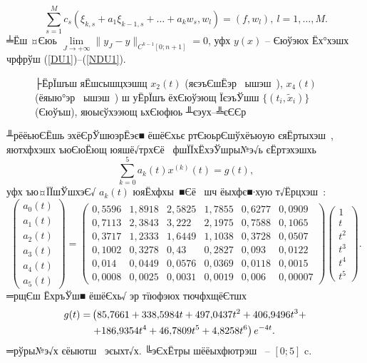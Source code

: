 \documentclass[12pt, a4paper, oneside]{article}
\begin{document}
\[
\sum\limits_{s=1}^M c_s ({\xi}_{k,s}+a_1 {\xi}_{k-1,s}+\dots +a_k w_s,w_l)=(f,w_l),~l=1,\dots,M.
\]
╧Ёш ¤Єюь $\lim\limits_{J\to +\infty} \|y_J-y\|_{C^{k-1}[0;n+1]}=0$, уфх $y(x)$ -- Єюўэюх Ёх°хэшх чрфрўш (\ref{DU1})--(\ref{NDU1}).
\begin{figure}[h]
\caption{├ЁрЇшъш яЁшсышцхэшщ $x_2(t)$ (яєэъЄшЁэр  ышэш ), $x_4(t)$ (ёяыю°эр  ышэш ) ш уЁрЇшъ ёхЄюўэющ ЇєэъЎшш $\{(t_i,\tilde{x}_i)\}$ (Єюўъш), яюыєўхээющ ьхЄюфюь ╨єэух--╩єЄЄр}
\label{LS5_J4_n1_T5}
\end{figure}
\begin{Ex} %
╨рёёьюЄЁшь эхёЄрЎшюэрЁэє■ ёшёЄхьє ртЄюьрЄшўхёъюую єяЁртыхэш , яютхфхэшх ъюЄюЁющ юяшё√трхЄё  фшЇЇхЁхэЎшры№э√ь єЁртэхэшхь
\[
\sum\limits_{k=0}^5 a_k(t)x^{(k)}(t)=g(t),
\]
уфх ъю¤ЇЇшЎшхэЄ√ $a_k(t)$ юяЁхфхы ■Єё  шч ёыхфє■∙хую т√Ёрцхэш :
\[
\begin{pmatrix}a_0(t)\\a_1(t)\\a_2(t)\\a_3(t)\\a_4(t)\\a_5(t)\end{pmatrix}=\begin{pmatrix}0{,}5596&1{,}8918&2{,}5825&1{,}7855&0{,}6277&0{,}0909\\
0{,}7113&2{,}3843&3{,}222&2{,}1975&0{,}7588&0{,}1065\\
0{,}3717&1{,}2333&1{,}6449&1{,}1038&0{,}3728&0{,}0507\\
0{,}1002&0{,}3278&0{,}43&0{,}2827&0{,}093&0{,}0122\\
0{,}014&0{,}0449&0{,}0576&0{,}0369&0{,}0118&0{,}0015\\
0{,}0008&0{,}0025&0{,}0031&0{,}0019&0{,}006&0{,}00007\end{pmatrix}
\begin{pmatrix}1\\t\\t^2\\t^3\\t^4\\t^5\end{pmatrix}.
\]
═рщЄш ЁхръЎш■ ёшёЄхь√ эр тїюфэюх тючфхщёЄтшх
\begin{align}
g(t)=&\left(85{,}7661+338{,}5984t+497{,}0437t^2+406{,}9496t^3+\right.\notag\\
&\left.+186{,}9354t^4+46{,}7809t^5+4{,}8258t^6\right)e^{-4t}.
\end{align}
═рўры№э√х єёыютш  эєыхт√х. ╚эЄхЁтры шёёыхфютрэш  -- $[0;5]$ c.
\end{Ex}
\end{document}
